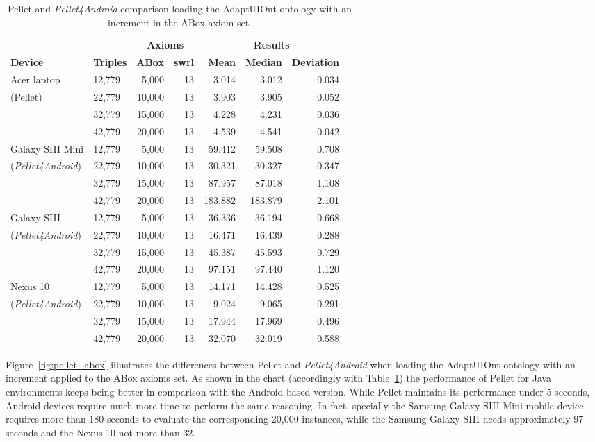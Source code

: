 \begin{table}
 \caption{Pellet and \textit{Pellet4Android} comparison loading the AdaptUIOnt 
ontology with an increment in the ABox axiom set.}
 \label{tbl:eval_abox}
 \footnotesize
 \centering
  \begin{tabular}{l l r r r r r r}
  \hline 
  &  & \multicolumn{2}{c}{\textbf{Axioms}} & 
  \multicolumn{3}{c}{\textbf{Results}}	\\
  \textbf{Device} & \textbf{Triples}& \textbf{ABox} & \textbf{\ac{swrl}}
  & \textbf{Mean} & \textbf{Median} & \textbf{Deviation}	\\
  \hline 
  Acer laptop & 12,779 & 5,000  & 13 & 3.014 & 3.012 & 0.034	\\  
  (Pellet)    & 22,779 & 10,000 & 13 & 3.903 & 3.905 & 0.052	\\
	      & 32,779 & 15,000	& 13 & 4.228 & 4.231 & 0.036	\\
	      & 42,779 & 20,000 & 13 & 4.539 & 4.541 & 0.042	\\
  \hline	      
  Galaxy SIII Mini& 12,779& 5,000& 13& 59.412& 59.508& 0.708	\\
  (\textit{Pellet4Android}) & 22,779 & 10,000 & 13 & 30.321 & 30.327 & 0.347 \\
	      & 32,779 & 15,000	& 13 & 87.957 & 87.018 & 1.108 	\\
	      & 42,779 & 20,000	& 13 & 183.882&183.879 & 2.101	\\
  \hline	      
  Galaxy SIII & 12,779 & 5,000	& 13 & 36.336 & 36.194 & 0.668	\\
(\textit{Pellet4Android})& 22,779 & 10,000 & 13	& 16.471 & 16.439 & 0.288\\
		& 32,779 & 15,000 & 13 & 45.387	& 45.593 & 0.729\\
		& 42,779 & 20,000 & 13 & 97.151	& 97.440 & 1.120\\
  \hline		
  Nexus 10	& 12,779 & 5,000  & 13 & 14.171 & 14.428 & 0.525\\
(\textit{Pellet4Android})& 22,779 & 10,000 & 13 & 9.024 & 9.065 & 0.291\\
		& 32,779 & 15,000 & 13 & 17.944& 17.969  & 0.496\\
		& 42,779 & 20,000 & 13 & 32.070	& 32.019 & 0.588\\
  \hline
\end{tabular}
\end{table}

Figure~\ref{fig:pellet_abox} illustrates the differences between Pellet and
\textit{Pellet4Android} when loading the AdaptUIOnt ontology with an increment 
applied to the ABox axioms set. As shown in the chart (accordingly with
Table~\ref{tbl:eval_abox}) the performance of Pellet for Java environments 
keeps being better in comparison with the Android based version. While Pellet
maintains its performance under 5 seconds, Android devices require much more
time to perform the same reasoning. In fact, specially the Samsung Galaxy SIII 
Mini mobile device requires more than 180 seconds to evaluate the corresponding
20,000 instances, while the Samsung Galaxy SIII needs approximately 97 seconds 
and the Nexus 10 not more than 32.

